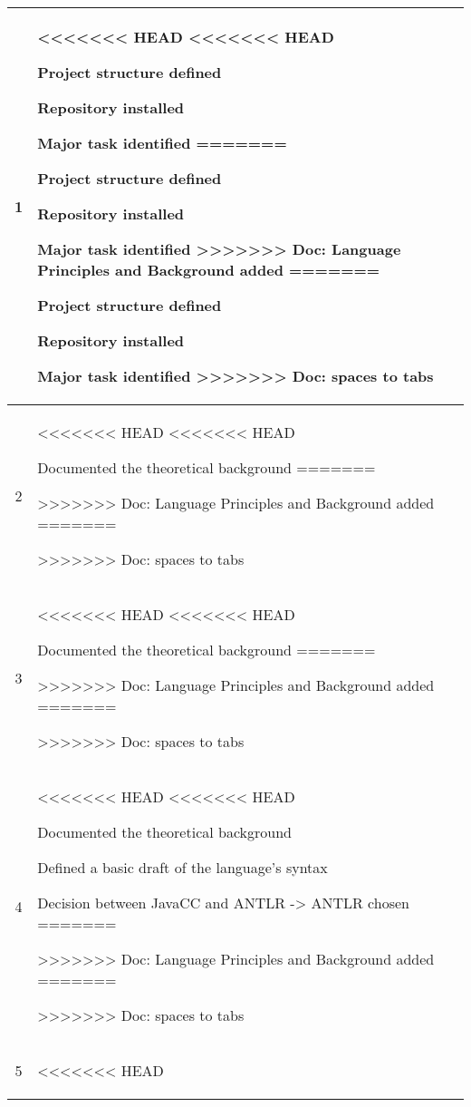 \begin{center}
\begin{longtable}{|c|p{12cm}|}
1 & 
\begin{journal}
<<<<<<< HEAD
<<<<<<< HEAD
	\item Project structure defined
	\item Repository installed
	\item Major task identified
=======
  \item Project structure defined
  \item Repository installed
  \item Major task identified
>>>>>>> Doc: Language Principles and Background added
=======
	\item Project structure defined
	\item Repository installed
	\item Major task identified
>>>>>>> Doc: spaces to tabs
\end{journal}
\\ \hline
2 & 
\begin{journal}
<<<<<<< HEAD
<<<<<<< HEAD
	\item Documented the theoretical background
=======
  \item 
>>>>>>> Doc: Language Principles and Background added
=======
	\item 
>>>>>>> Doc: spaces to tabs
\end{journal}
\\ \hline
3 & 
\begin{journal}
<<<<<<< HEAD
<<<<<<< HEAD
	\item Documented the theoretical background
=======
  \item 
>>>>>>> Doc: Language Principles and Background added
=======
	\item 
>>>>>>> Doc: spaces to tabs
\end{journal}
\\ \hline
4 & 
\begin{journal}
<<<<<<< HEAD
<<<<<<< HEAD
	\item Documented the theoretical background
	\item Defined a basic draft of the language's syntax
	\item Decision between JavaCC and ANTLR -> ANTLR chosen
=======
  \item 
>>>>>>> Doc: Language Principles and Background added
=======
	\item 
>>>>>>> Doc: spaces to tabs
\end{journal}
\\ \hline
5 & 
\begin{journal}
<<<<<<< HEAD

\end{journal}
\end{longtable}
\end{center}
